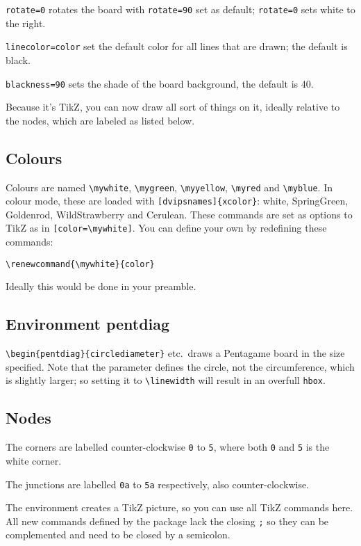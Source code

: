 \documentclass[a5paper]{scrartcl}
\begin{document}
\verb|rotate=0| rotates the board with \verb|rotate=90| set as default; \verb|rotate=0| sets white to the right.
    
\verb|linecolor=color| set the default color for all lines that are drawn; the default is black. 
    
\verb|blackness=90| sets the shade of the board background, the default is 40.

Because it's TikZ, you can now draw all sort of things on it, ideally relative to the nodes, which are labeled as listed below.

\subsection*{Colours}

Colours are named \verb|\mywhite|, \verb|\mygreen|, \verb|\myyellow|, \verb|\myred| and \verb|\myblue|. In colour mode, these are loaded with \verb|[dvipsnames]{xcolor}|: white, SpringGreen, Goldenrod, WildStrawberry and Cerulean. These commands are set as options to TikZ as in \verb|[color=\mywhite]|. You can define your own by redefining these commands:

\verb|\renewcommand{\mywhite}{color}|

Ideally this would be done in your preamble.


\subsection*{Environment pentdiag}

\verb|\begin{pentdiag}{circlediameter}| etc.~draws a Pentagame board in the size specified. Note that the parameter defines the circle, not the circumference, which is slightly larger; so setting it to \verb|\linewidth| will result in an overfull \verb|hbox|.

\subsection*{Nodes}

The corners are labelled counter-clockwise \verb|0| to \verb|5|, where both \verb|0| and \verb|5| is the white corner.  

The junctions are labelled \verb|0a| to \verb|5a| respectively, also counter-clockwise.

The environment creates a TikZ picture, so you can use all TikZ commands here. All new commands defined by the package lack the closing \verb|;| so they can be complemented and need to be closed by a semicolon. 
\end{document}

